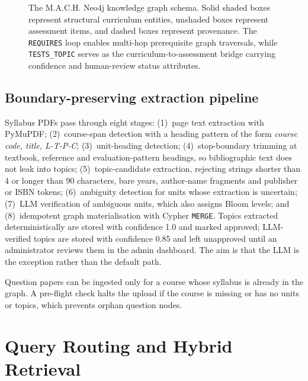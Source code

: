 \documentclass[conference]{IEEEtran}
\newcommand{\code}[1]{\texttt{\small #1}}
\begin{document}
\begin{figure}[t]
{\begin{tikzpicture}
\end{tikzpicture}}
\caption{The \textsc{M.A.C.H.} Neo4j knowledge graph schema. Solid shaded boxes represent structural curriculum entities, unshaded boxes represent assessment items, and dashed boxes represent provenance. The \texttt{REQUIRES} loop enables multi-hop prerequisite graph traversals, while \texttt{TESTS\_TOPIC} serves as the curriculum-to-assessment bridge carrying confidence and human-review status attributes.}
\label{fig:schema}
\end{figure}


\subsection{Boundary-preserving extraction pipeline}
Syllabus PDFs pass through eight stages: (1)~page text extraction with PyMuPDF; (2)~course-span detection with a heading pattern of the form \emph{course code, title, L-T-P-C}; (3)~unit-heading detection; (4)~stop-boundary trimming at textbook, reference and evaluation-pattern headings, so bibliographic text does not leak into topics; (5)~topic-candidate extraction, rejecting strings shorter than 4 or longer than 90 characters, bare years, author-name fragments and publisher or ISBN tokens; (6)~ambiguity detection for units whose extraction is uncertain; (7)~LLM verification of ambiguous units, which also assigns Bloom levels; and (8)~idempotent graph materialisation with Cypher \code{MERGE}. Topics extracted deterministically are stored with confidence 1.0 and marked approved; LLM-verified topics are stored with confidence 0.85 and left unapproved until an administrator reviews them in the admin dashboard. The aim is that the LLM is the exception rather than the default path.

Question papers can be ingested only for a course whose syllabus is already in the graph. A pre-flight check halts the upload if the course is missing or has no units or topics, which prevents orphan question nodes.

\section{Query Routing and Hybrid Retrieval}\label{sec:routing}
\end{document}
